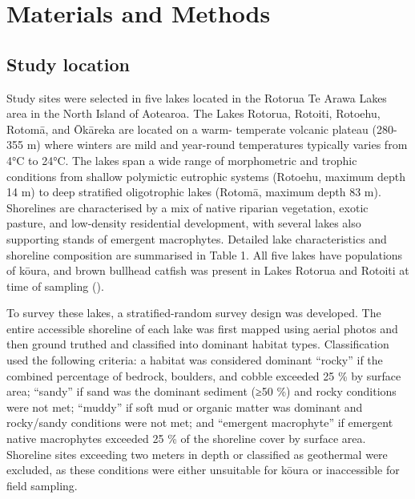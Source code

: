 \documentclass[
  letterpaper,
  DIV=11,
  numbers=noendperiod]{scrartcl}
\begin{document}
\section{Materials and Methods}\label{materials-and-methods}

\subsection{Study location}\label{study-location}

Study sites were selected in five lakes located in the Rotorua Te Arawa
Lakes area in the North Island of Aotearoa. The Lakes Rotorua, Rotoiti,
Rotoehu, Rotomā, and Ōkāreka are located on a warm- temperate volcanic
plateau (280-355 m) where winters are mild and year-round temperatures
typically varies from 4°C to 24°C. The lakes span a wide range of
morphometric and trophic conditions from shallow polymictic eutrophic
systems (Rotoehu, maximum depth 14 m) to deep stratified oligotrophic
lakes (Rotomā, maximum depth 83 m). Shorelines are characterised by a
mix of native riparian vegetation, exotic pasture, and low-density
residential development, with several lakes also supporting stands of
emergent macrophytes. Detailed lake characteristics and shoreline
composition are summarised in Table 1. All five lakes have populations
of kōura, and brown bullhead catfish was present in Lakes Rotorua and
Rotoiti at time of sampling ().

To survey these lakes, a stratified-random survey design was developed.
The entire accessible shoreline of each lake was first mapped using
aerial photos and then ground truthed and classified into dominant
habitat types. Classification used the following criteria: a habitat was
considered dominant ``rocky'' if the combined percentage of bedrock,
boulders, and cobble exceeded 25 \% by surface area; ``sandy'' if sand
was the dominant sediment (≥50 \%) and rocky conditions were not met;
``muddy'' if soft mud or organic matter was dominant and rocky/sandy
conditions were not met; and ``emergent macrophyte'' if emergent native
macrophytes exceeded 25 \% of the shoreline cover by surface area.
Shoreline sites exceeding two meters in depth or classified as
geothermal were excluded, as these conditions were either unsuitable for
kōura or inaccessible for field sampling.
\end{document}
